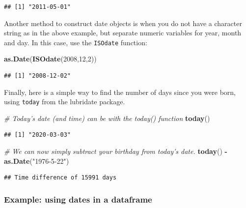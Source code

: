 \documentclass[]{book}
\newenvironment{Shaded}{\begin{snugshade}}{\end{snugshade}}
\newcommand{\CommentTok}[1]{\textcolor[rgb]{0.56,0.35,0.01}{\textit{#1}}}
\newcommand{\DecValTok}[1]{\textcolor[rgb]{0.00,0.00,0.81}{#1}}
\newcommand{\KeywordTok}[1]{\textcolor[rgb]{0.13,0.29,0.53}{\textbf{#1}}}
\newcommand{\NormalTok}[1]{#1}
\newcommand{\OperatorTok}[1]{\textcolor[rgb]{0.81,0.36,0.00}{\textbf{#1}}}
\newcommand{\StringTok}[1]{\textcolor[rgb]{0.31,0.60,0.02}{#1}}
\begin{document}
\begin{verbatim}
## [1] "2011-05-01"
\end{verbatim}

Another method to construct date objects is when you do not have a character string as in the above example, but separate numeric variables for year, month and day. In this case, use the \texttt{ISOdate} function:

\begin{Shaded}
\begin{Highlighting}[]
\KeywordTok{as.Date}\NormalTok{(}\KeywordTok{ISOdate}\NormalTok{(}\DecValTok{2008}\NormalTok{,}\DecValTok{12}\NormalTok{,}\DecValTok{2}\NormalTok{))}
\end{Highlighting}
\end{Shaded}

\begin{verbatim}
## [1] "2008-12-02"
\end{verbatim}

Finally, here is a simple way to find the number of days since you were born, using \texttt{today} from the lubridate package.

\begin{Shaded}
\begin{Highlighting}[]
\CommentTok{# Today's date (and time) can be with the today() function}
\KeywordTok{today}\NormalTok{()}
\end{Highlighting}
\end{Shaded}

\begin{verbatim}
## [1] "2020-03-03"
\end{verbatim}

\begin{Shaded}
\begin{Highlighting}[]
\CommentTok{# We can now simply subtract your birthday from today's date.}
\KeywordTok{today}\NormalTok{() }\OperatorTok{-}\StringTok{ }\KeywordTok{as.Date}\NormalTok{(}\StringTok{"1976-5-22"}\NormalTok{)}
\end{Highlighting}
\end{Shaded}

\begin{verbatim}
## Time difference of 15991 days
\end{verbatim}

\hypertarget{datesdataframe}{%
\subsubsection{Example: using dates in a dataframe}\label{datesdataframe}}
\end{document}
